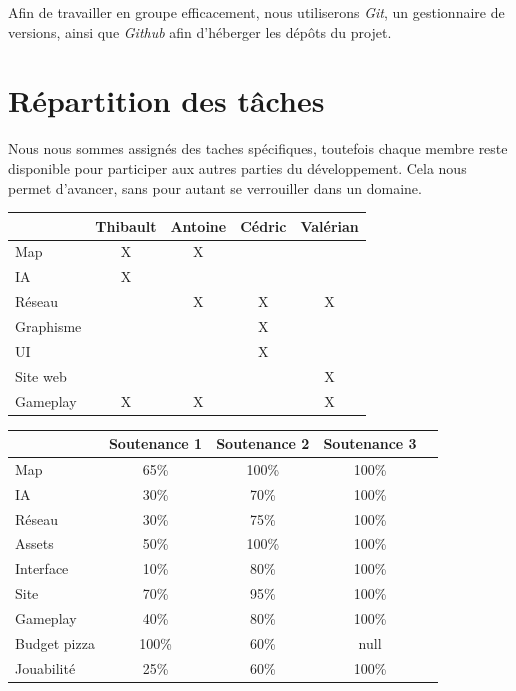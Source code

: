 \documentclass[12pt]{report}
\begin{document}
Afin de travailler en groupe efficacement, nous utiliserons \textit{Git}, un gestionnaire de versions, ainsi que \textit{Github} afin d’héberger les dépôts du projet.\\

\chapter{Répartition des tâches}

Nous nous sommes assignés des taches spécifiques, toutefois chaque membre reste disponible pour participer aux autres parties du développement. Cela nous permet d’avancer, sans pour autant se verrouiller dans un domaine.\\

\begin{center}
\begin{tabular}{@{} l *4c @{}}
\toprule
\multicolumn{1}{c}{}    & \textbf{Thibault}  & \textbf{Antoine}  & \textbf{Cédric} & \textbf{Valérian} \\ 
\midrule
Map & X & X & & \\
IA & X & & & \\
Réseau & & X & X & X \\
Graphisme & & & X & \\
UI & & & X & \\
Site web & & & & X \\
Gameplay & X & X & & X\\
\bottomrule
\end{tabular}
\end{center}

\vspace{2em}

\begin{center}
\begin{tabular}{@{} l *4c @{}}
\toprule
\multicolumn{1}{c}{}    & \textbf{Soutenance 1}  & \textbf{Soutenance 2}  & \textbf{Soutenance 3} \\ 
\midrule
Map & 65\% & 100\% & 100\% \\
IA & 30\% & 70\% & 100\% \\
Réseau & 30\% & 75\% & 100\% \\
Assets & 50\% & 100\% & 100\% \\
Interface & 10\% & 80\% & 100\% \\
Site & 70\% & 95\% & 100\% \\
Gameplay & 40\% & 80\% & 100\% \\
Budget pizza & 100\% & 60\% & null\\
\midrule
Jouabilité & 25\% & 60\% & 100\% \\
\bottomrule
\end{tabular}
\end{center}
\end{document}
